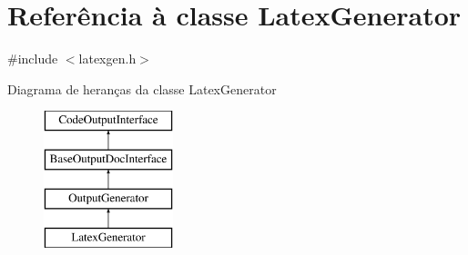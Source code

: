 \hypertarget{class_latex_generator}{\section{Referência à classe Latex\-Generator}
\label{class_latex_generator}
}


{\ttfamily \#include $<$latexgen.\-h$>$}

Diagrama de heranças da classe Latex\-Generator\begin{figure}[H]
\begin{center}
\leavevmode
\includegraphics[height=4.000000cm]{class_latex_generator}
\end{center}
\end{figure}

